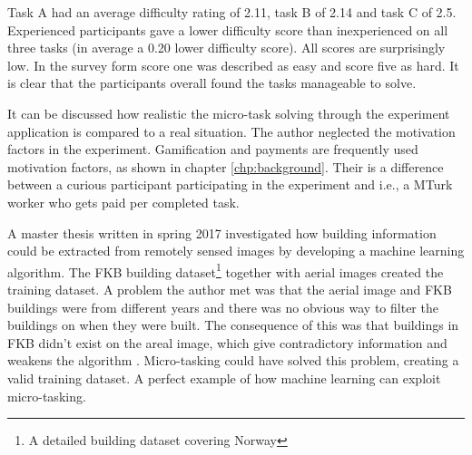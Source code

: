 Task A had an average difficulty rating of 2.11, task B of 2.14 and task C of 2.5. Experienced participants gave a lower difficulty score than inexperienced on all three tasks (in average a 0.20 lower difficulty score). All scores are surprisingly low. In the survey form score one was described as easy and score five as hard. It is clear that the participants overall found the tasks manageable to solve. 


It can be discussed how realistic the micro-task solving through the experiment application is compared to a real situation. The author neglected the motivation factors in the experiment. Gamification and payments are frequently used motivation factors, as shown in chapter \ref{chp:background}. Their is a difference between a curious participant participating in the experiment and i.e., a MTurk worker who gets paid per completed task. 

A master thesis written in spring 2017 investigated how building information could be extracted from remotely sensed images by developing a machine learning algorithm. The FKB building dataset\footnote{A detailed building dataset covering Norway} together with aerial images created the training dataset. A problem the author met was that the aerial image and FKB buildings were from different years and there was no obvious way to filter the buildings on when they were built. The consequence of this was that buildings in FKB didn't exist on the areal image, which give contradictory information and weakens the algorithm \citep{Orstavik2017}. Micro-tasking could have solved this problem, creating a valid training dataset. A perfect example of how  machine learning can exploit micro-tasking.

